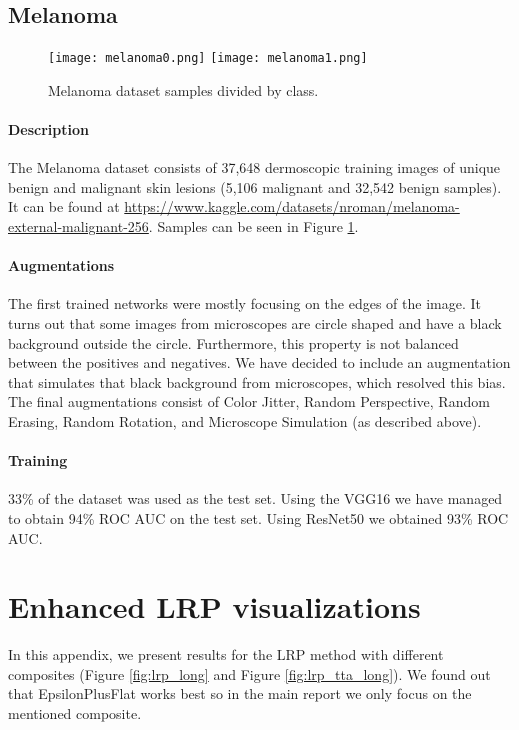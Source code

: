 \documentclass[twoside,11pt]{article}
\begin{document}
\subsection{Melanoma}
\begin{figure}[t]
    \centering
    \texttt{[image: melanoma0.png]}
    \texttt{[image: melanoma1.png]}
    \caption{Melanoma dataset samples divided by class.}
    \label{fig:melanoma_dataset}
\end{figure}
\paragraph{Description}
The Melanoma dataset \citep{melanoma} consists of 37,648 dermoscopic training images of unique benign and malignant skin lesions (5,106 malignant and 32,542 benign samples).
It can be found at \url{https://www.kaggle.com/datasets/nroman/melanoma-external-malignant-256}.
Samples can be seen in Figure \ref{fig:melanoma_dataset}.
\paragraph{Augmentations}
The first trained networks were mostly focusing on the edges of the image. It turns out that some images from microscopes are circle shaped and have a black background outside the circle. Furthermore, this property is not balanced between the positives and negatives. We have decided to include an augmentation that simulates that black background from microscopes, which resolved this bias. The final augmentations consist of Color Jitter, Random Perspective, Random Erasing, Random Rotation, and Microscope Simulation (as described above).
\paragraph{Training}
33\% of the dataset was used as the test set.
Using the VGG16 we have managed to obtain 94\% ROC AUC on the test set.
Using ResNet50 we obtained 93\% ROC AUC.

\section{Enhanced LRP visualizations} \label{appendix:lrp}
In this appendix, we present results for the LRP method with different composites (Figure \ref{fig:lrp_long} and Figure \ref{fig:lrp_tta_long}).
We found out that EpsilonPlusFlat works best so in the main report we only focus on the mentioned composite.
\end{document}
